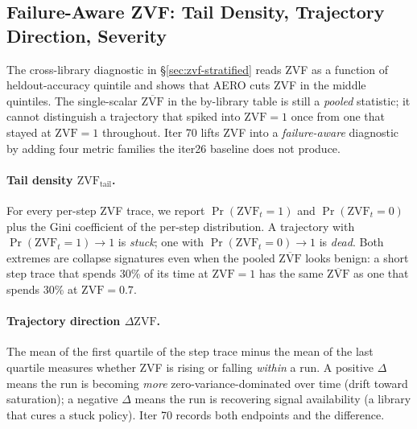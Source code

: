 
\subsection{Failure-Aware ZVF: Tail Density, Trajectory Direction, Severity}
\label{sec:zvf-failure-aware}

The cross-library diagnostic in \S\ref{sec:zvf-stratified} reads
ZVF as a function of heldout-accuracy quintile and shows that AERO
cuts ZVF in the middle quintiles. The single-scalar
$\overline{\mathrm{ZVF}}$ in the by-library table is still a
\emph{pooled} statistic; it cannot distinguish a trajectory that
spiked into $\mathrm{ZVF}=1$ once from one that stayed at
$\mathrm{ZVF}=1$ throughout. Iter 70 lifts ZVF into a
\emph{failure-aware} diagnostic by adding four metric families the
iter26 baseline does not produce.

\paragraph{Tail density $\mathrm{ZVF}_{\mathrm{tail}}$.}
For every per-step ZVF trace, we report
$\Pr(\mathrm{ZVF}_t = 1)$ and $\Pr(\mathrm{ZVF}_t = 0)$ plus the
Gini coefficient of the per-step distribution. A trajectory with
$\Pr(\mathrm{ZVF}_t = 1) \to 1$ is \emph{stuck}; one with
$\Pr(\mathrm{ZVF}_t = 0) \to 1$ is \emph{dead}. Both extremes are
collapse signatures even when the pooled
$\overline{\mathrm{ZVF}}$ looks benign: a short step trace that
spends 30\% of its time at $\mathrm{ZVF}=1$ has the same
$\overline{\mathrm{ZVF}}$ as one that spends 30\% at $\mathrm{ZVF}=0.7$.

\paragraph{Trajectory direction $\Delta\mathrm{ZVF}$.}
The mean of the first quartile of the step trace minus the mean of
the last quartile measures whether ZVF is rising or falling
\emph{within} a run. A positive $\Delta$ means the run is becoming
\emph{more} zero-variance-dominated over time (drift toward
saturation); a negative $\Delta$ means the run is recovering
signal availability (a library that cures a stuck policy). Iter 70
records both endpoints and the difference.

